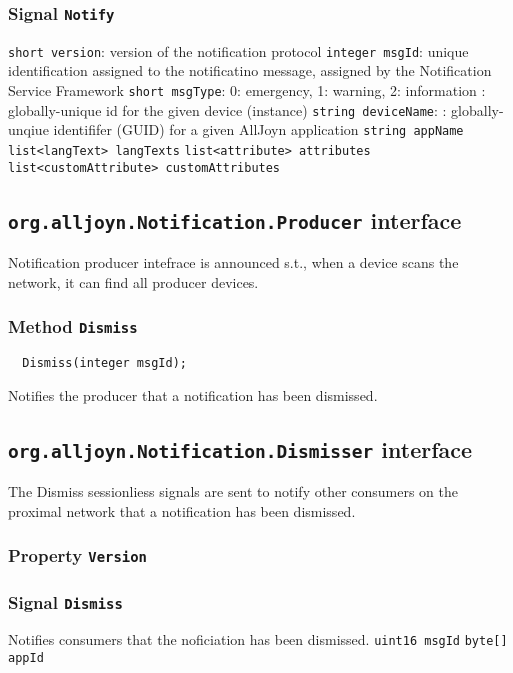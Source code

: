 \documentclass{note}
\begin{document}
\subsubsection{Signal {\bf\texttt{Notify}}}
     \bit
     \w \verb+short version+: version of the notification protocol
     \w \verb+integer msgId+: unique identification assigned to the
     notificatino message, assigned by the Notification Service Framework
     \w \verb+short msgType+: 0: emergency, 1: warning, 2: information
     : globally-unique id for the given device
                                        (instance) 
     \w \verb+string deviceName+: 
     : globally-unqiue identififer (GUID) for a
                                    given AllJoyn application
     \w \verb+string appName+
     \w \verb+list<langText> langTexts+
     \w \verb+list<attribute> attributes+
     \w \verb+list<customAttribute> customAttributes+
     \eit
\subsection{{\bf\texttt{org.alljoyn.Notification.Producer}} interface}
Notification producer intefrace is announced s.t., when a device scans the
network, it can find all producer devices.
\subsubsection{Method {\bf\texttt{Dismiss}}}
\begin{verbatim}
  Dismiss(integer msgId);
\end{verbatim}
Notifies the producer that a notification
  has been dismissed.

\subsection{{\bf\texttt{org.alljoyn.Notification.Dismisser}} interface}
The Dismiss sessionliess signals are sent to notify other consumers on the
proximal network that a notification has been dismissed.

\subsubsection{Property {\bf\texttt{Version}}}

\subsubsection{Signal {\bf\texttt{Dismiss}}}
Notifies consumers that the
  noficiation has been dismissed.
    \bit
    \w \verb+uint16 msgId+
    \w \verb+byte[] appId+
    \eit
\end{document}
